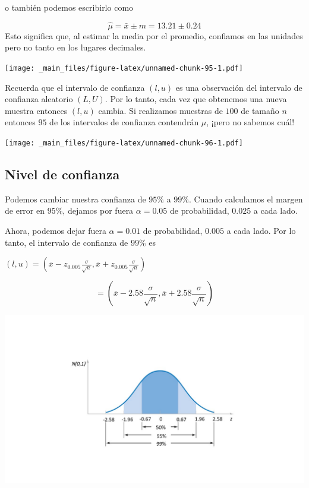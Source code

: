 \documentclass[
]{book}
\begin{document}
o también podemos escribirlo como

\[\hat{\mu}=\bar{x} \pm m = 13.21 \pm 0.24\]
Esto significa que, al estimar la media por el promedio, confiamos en las unidades pero no tanto en los lugares decimales.

\texttt{[image: \_main\_files/figure-latex/unnamed-chunk-95-1.pdf]}

Recuerda que el intervalo de confianza \((l,u)\) es una observación del intervalo de confianza aleatorio \((L,U)\). Por lo tanto, cada vez que obtenemos una nueva muestra entonces \((l,u)\) cambia. Si realizamos muestras de \(100\) de tamaño \(n\) entonces \(95%
\) de los intervalos de confianza contendrán \(\mu\), ¡pero no sabemos cuál!

\texttt{[image: \_main\_files/figure-latex/unnamed-chunk-96-1.pdf]}

\hypertarget{nivel-de-confianza}{%
\subsection{Nivel de confianza}\label{nivel-de-confianza}}

Podemos cambiar nuestra confianza de \(95\%\) a \(99\%\). Cuando calculamos el margen de error en \(95\%\), dejamos por fuera \(\alpha=0.05\) de probabilidad, \(0.025\) a cada lado.

Ahora, podemos dejar fuera \(\alpha=0.01\) de probabilidad, \(0.005\) a cada lado. Por lo tanto, el intervalo de confianza de \(99\%\) es

\((l,u) = (\bar{x} - z_{0.005}\frac{\sigma}{\sqrt{n}},\bar{x} + z_{0.005}\frac{\sigma}{\sqrt{n}})\)

\[= (\bar{x} - 2.58\frac{\sigma}{\sqrt{n}},\bar{x} + 2.58\frac{\sigma}{\sqrt{n}})\]

\includegraphics{./figures/phi.JPG}
\end{document}

